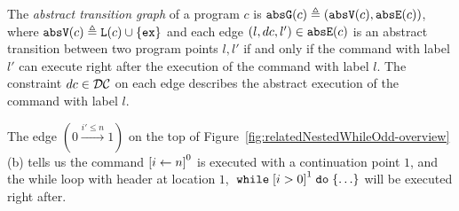 
\begin{defn}
 \label{def:abs_cfg}
 The \emph{abstract transition graph} of a program $c$ is $\mathtt{abs}{\mathtt{G}}(c) \triangleq (\mathtt{abs}{\mathtt{V}}(c), \mathtt{abs}{\mathtt{E}}(c))$, where
 $\mathtt{abs}{\mathtt{V}}(c) \triangleq \mathtt{L}(c)\cup\{\mathtt{ex}\}$
 and 
 each edge $(l, dc, l') \in \mathtt{abs}{\mathtt{E}}(c)$ is an abstract transition
between two program points $l, l'$ if and only if
the command with label $l'$ can execute right after the execution of the command with label $l$.
The constraint $dc \in \mathcal{DC}$ on each edge
describes the abstract execution of the command with label $l$.
\end{defn}
The edge $(0 \xrightarrow{i' \leq n} 1)$ on the top of Figure~\ref{fig:relatedNestedWhileOdd-overview}(b) tells us the command 
$\clabel{\assign{i}{n}}^0$ is executed with a continuation point $1$, and the while loop with header at location $1$, $\ewhile \clabel{i > 0}^1 \edo \{\ldots\}$ will be executed right after.

